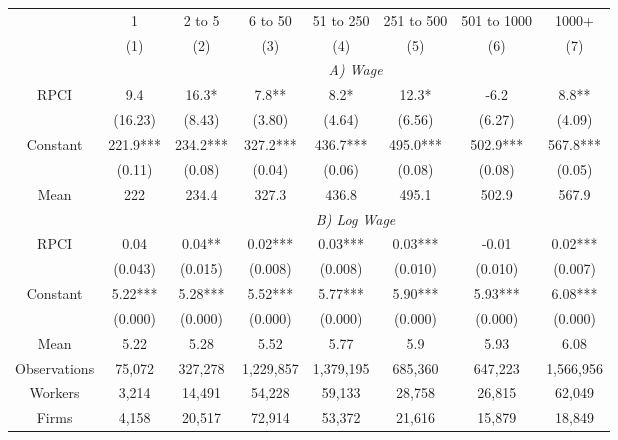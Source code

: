 \begin{tabular}{cccccccc}
\toprule
\toprule
      & 1     & 2 to 5 & 6 to 50 & 51 to 250 & 251 to 500 & 501 to 1000 & 1000+ \\
      & (1)   & (2)   & (3)   & (4)   & (5)   & (6)   & (7) \\
\cmidrule{2-8}      & \multicolumn{7}{c}{\textit{A) Wage}} \\
\midrule
RPCI  & 9.4   & 16.3* & 7.8** & 8.2*  & 12.3* & -6.2  & 8.8** \\
      & (16.23) & (8.43) & (3.80) & (4.64) & (6.56) & (6.27) & (4.09) \\
Constant & 221.9*** & 234.2*** & 327.2*** & 436.7*** & 495.0*** & 502.9*** & 567.8*** \\
      & (0.11) & (0.08) & (0.04) & (0.06) & (0.08) & (0.08) & (0.05) \\
Mean  & 222   & 234.4 & 327.3 & 436.8 & 495.1 & 502.9 & 567.9 \\
\cmidrule{2-8}      & \multicolumn{7}{c}{\textit{B) Log Wage}} \\
\midrule
RPCI  & 0.04  & 0.04** & 0.02*** & 0.03*** & 0.03*** & -0.01 & 0.02*** \\
      & (0.043) & (0.015) & (0.008) & (0.008) & (0.010) & (0.010) & (0.007) \\
Constant & 5.22*** & 5.28*** & 5.52*** & 5.77*** & 5.90*** & 5.93*** & 6.08*** \\
      & (0.000) & (0.000) & (0.000) & (0.000) & (0.000) & (0.000) & (0.000) \\
Mean  & 5.22  & 5.28  & 5.52  & 5.77  & 5.9   & 5.93  & 6.08 \\
\midrule
Observations & 75,072 & 327,278 & 1,229,857 & 1,379,195 & 685,360 & 647,223 & 1,566,956 \\
Workers & 3,214 & 14,491 & 54,228 & 59,133 & 28,758 & 26,815 & 62,049 \\
Firms & 4,158 & 20,517 & 72,914 & 53,372 & 21,616 & 15,879 & 18,849 \\
\bottomrule
\bottomrule
\end{tabular}%
